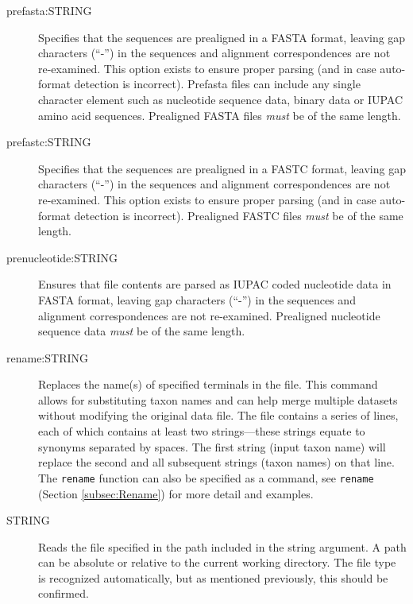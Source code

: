 \begin{description}
		\item [prefasta:STRING] Specifies that the sequences are prealigned in a FASTA format, leaving 
		gap characters (``-'') in the sequences and alignment correspondences are not re-examined. 
		This option exists to ensure proper parsing (and in case auto-format detection is incorrect).
		Prefasta files can include any single character element such as nucleotide sequence data, 
		binary data or IUPAC amino acid sequences. Prealigned FASTA files \textit{must} be of the same length. 
			
		\item [prefastc:STRING] Specifies that the sequences are prealigned in a FASTC format, leaving gap 
		characters (``-'') in the sequences and alignment correspondences are not re-examined. 
		This option exists to ensure proper parsing (and in case auto-format detection is incorrect).
		Prealigned FASTC files \textit{must} be of the same length.			
		
		\item [prenucleotide:STRING] Ensures that file contents are parsed as IUPAC coded nucleotide data 
		in FASTA \citep{PearsonandLipman1988} format, leaving gap characters (``-'') in the sequences 
		and alignment correspondences are not re-examined. Prealigned nucleotide sequence data 
		\textit{must} be of the same length.
		
		\item [rename:STRING] Replaces the name(s) of specified terminals in the file. This 
		command allows for substituting taxon names and can help merge multiple datasets without 
		modifying the original data file. The file contains a series of lines, each of which contains at 
		least two strings---these strings equate to synonyms separated by spaces. The first string 
		(input taxon name) will replace the second and all subsequent strings (taxon names) on 
		that line. The \texttt{rename} function can also be specified as a command, see \texttt{rename}
		(Section \ref{subsec:Rename}) for more detail and examples.
					 
		\item[STRING] Reads the file specified in the path included in the string argument. A path 
		can be absolute or relative to the current working directory. The file type is recognized
		automatically, but as mentioned previously, this should be confirmed.


\end{description}
